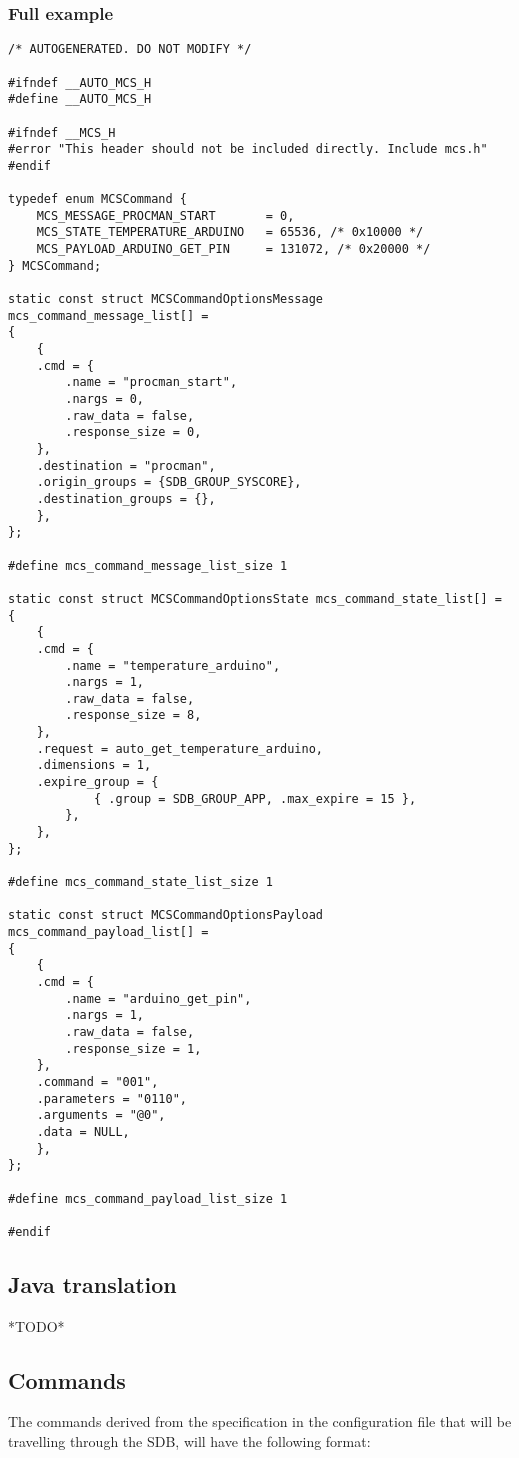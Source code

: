 \documentclass[12pt,a4paper]{report}
\begin{document}
\subsubsection{Full example}
\begin{lstlisting}
/* AUTOGENERATED. DO NOT MODIFY */

#ifndef __AUTO_MCS_H
#define __AUTO_MCS_H

#ifndef __MCS_H
#error "This header should not be included directly. Include mcs.h"
#endif

typedef enum MCSCommand {
    MCS_MESSAGE_PROCMAN_START       = 0,
    MCS_STATE_TEMPERATURE_ARDUINO   = 65536, /* 0x10000 */
    MCS_PAYLOAD_ARDUINO_GET_PIN     = 131072, /* 0x20000 */
} MCSCommand;

static const struct MCSCommandOptionsMessage mcs_command_message_list[] =
{
    {
    .cmd = {
        .name = "procman_start",
        .nargs = 0,
        .raw_data = false,
        .response_size = 0,
    },
    .destination = "procman",
    .origin_groups = {SDB_GROUP_SYSCORE},
    .destination_groups = {},
    },
};

#define mcs_command_message_list_size 1

static const struct MCSCommandOptionsState mcs_command_state_list[] =
{
    {
    .cmd = {
        .name = "temperature_arduino",
        .nargs = 1,
        .raw_data = false,
        .response_size = 8,
    },
    .request = auto_get_temperature_arduino,
    .dimensions = 1,
    .expire_group = {
            { .group = SDB_GROUP_APP, .max_expire = 15 },
        },
    },
};

#define mcs_command_state_list_size 1

static const struct MCSCommandOptionsPayload mcs_command_payload_list[] =
{
    {
    .cmd = {
        .name = "arduino_get_pin",
        .nargs = 1,
        .raw_data = false,
        .response_size = 1,
    },
    .command = "001",
    .parameters = "0110",
    .arguments = "@0",
    .data = NULL,
    },
};

#define mcs_command_payload_list_size 1

#endif
\end{lstlisting}

\subsection*{Java translation}
*TODO*

\subsection*{Commands}
The commands derived from the specification in the configuration file that will be travelling through the SDB, will have the following format:
\end{document}
